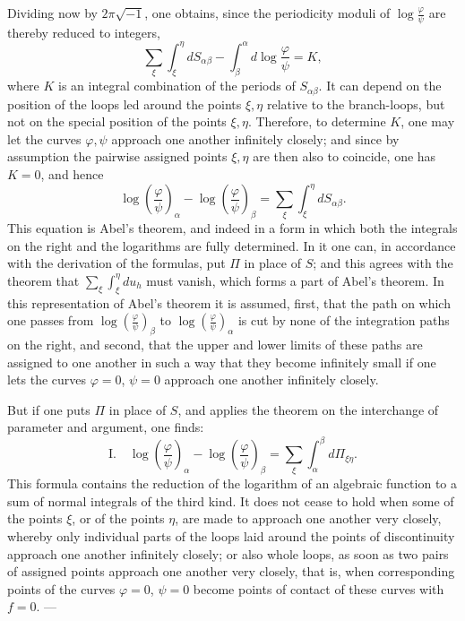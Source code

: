 \documentclass[10pt]{article}
\begin{document}
Dividing now by \(2\pi\sqrt{-1}\), one obtains, since the periodicity moduli of \(\log\frac{\varphi}{\psi}\) are thereby reduced to integers,
\[
\sum_{\xi}\int_{\xi}^{\eta}dS_{\alpha\beta}-\int_{\beta}^{\alpha}d\log\frac{\varphi}{\psi}=K,
\]
where \(K\) is an integral combination of the periods of \(S_{\alpha\beta}\). It can depend on the position of the loops led around the points \(\xi,\eta\) relative to the branch-loops, but not on the special position of the points \(\xi,\eta\). Therefore, to determine \(K\), one may let the curves \(\varphi,\psi\) approach one another infinitely closely; and since by assumption the pairwise assigned points \(\xi,\eta\) are then also to coincide, one has \(K=0\), and hence
\[
\log\left(\frac{\varphi}{\psi}\right)_\alpha-\log\left(\frac{\varphi}{\psi}\right)_\beta
=\sum_{\xi}\int_{\xi}^{\eta}dS_{\alpha\beta}.
\]
This equation is Abel's theorem, and indeed in a form in which both the integrals on the right and the logarithms are fully determined. In it one can, in accordance with the derivation of the formulas, put \(\Pi\) in place of \(S\); and this agrees with the theorem that \(\sum_{\xi}\int_{\xi}^{\eta}du_h\) must vanish, which forms a part of Abel's theorem. In this representation of Abel's theorem it is assumed, first, that the path on which one passes from \(\log(\frac{\varphi}{\psi})_\beta\) to \(\log(\frac{\varphi}{\psi})_\alpha\) is cut by none of the integration paths on the right, and second, that the upper and lower limits of these paths are assigned to one another in such a way that they become infinitely small if one lets the curves \(\varphi=0\), \(\psi=0\) approach one another infinitely closely.

But if one puts \(\Pi\) in place of \(S\), and applies the theorem on the interchange of parameter and argument, one finds:
\[
\mathrm{I.}\quad
\log\left(\frac{\varphi}{\psi}\right)_\alpha-\log\left(\frac{\varphi}{\psi}\right)_\beta
=\sum_{\xi}\int_{\alpha}^{\beta}d\Pi_{\xi\eta}.
\]
This formula contains the reduction of the logarithm of an algebraic function to a sum of normal integrals of the third kind. It does not cease to hold when some of the points \(\xi\), or of the points \(\eta\), are made to approach one another very closely, whereby only individual parts of the loops laid around the points of discontinuity approach one another infinitely closely; or also whole loops, as soon as two pairs of assigned points approach one another very closely, that is, when corresponding points of the curves \(\varphi=0\), \(\psi=0\) become points of contact of these curves with \(f=0\). ---
\end{document}
